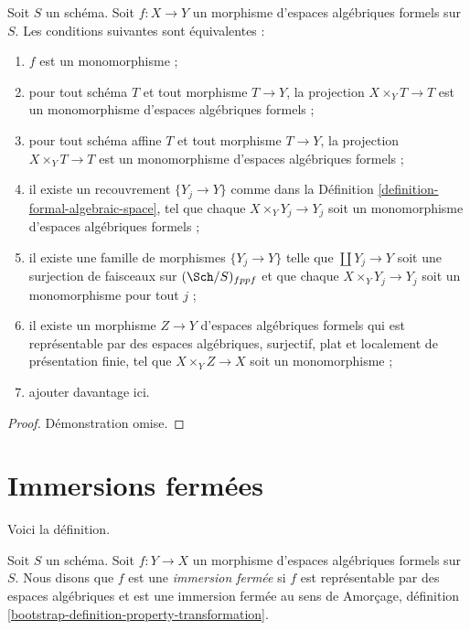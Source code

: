 \begin{lemma}
\label{lemma-characterize-monomorphisms}
Soit $S$ un schéma. Soit $f : X \to Y$ un morphisme d'espaces algébriques formels
sur $S$. Les conditions suivantes sont équivalentes :
\begin{enumerate}
\item $f$ est un monomorphisme ;
\item pour tout schéma $T$ et tout morphisme $T \to Y$,
la projection $X \times_Y T \to T$ est un monomorphisme
d'espaces algébriques formels ;
\item pour tout schéma affine $T$ et tout morphisme $T \to Y$,
la projection $X \times_Y T \to T$ est un monomorphisme d'espaces algébriques
formels ;
\item il existe un recouvrement $\{Y_j \to Y\}$ comme dans la
Définition \ref{definition-formal-algebraic-space},
tel que chaque $X \times_Y Y_j \to Y_j$ soit un monomorphisme
d'espaces algébriques formels ;
\item il existe une famille de morphismes $\{Y_j \to Y\}$ telle
que $\coprod Y_j \to Y$ soit une surjection de faisceaux sur
$(\Sch/S)_{fppf}$ et que chaque $X \times_Y Y_j \to Y_j$ soit un
monomorphisme pour tout $j$ ;
\item il existe un morphisme $Z \to Y$ d'espaces algébriques formels
qui est représentable par des espaces algébriques, surjectif, plat et localement
de présentation finie, tel que $X \times_Y Z \to X$ soit un monomorphisme ;
\item ajouter davantage ici.
\end{enumerate}
\end{lemma}

\begin{proof}
Démonstration omise.
\end{proof}





\section{Immersions fermées}
\label{section-closed-immersions}

\noindent
Voici la définition.

\begin{definition}
\label{definition-closed-immersion}
Soit $S$ un schéma. Soit $f : Y \to X$ un morphisme d'espaces algébriques formels
sur $S$. Nous disons que $f$ est une {\it immersion fermée}
si $f$ est représentable par des espaces algébriques et est une immersion fermée
au sens de
Amorçage, définition \ref{bootstrap-definition-property-transformation}.
\end{definition}


